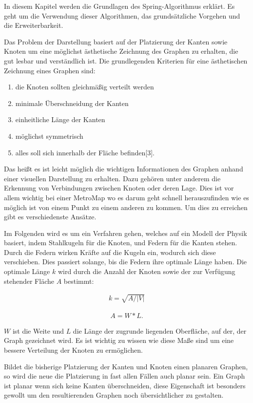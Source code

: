 In diesem Kapitel werden die Grundlagen des Spring-Algorithmus erklärt. 
Es geht um die Verwendung dieser Algorithmen, das grundsätzliche Vorgehen
und die Erweiterbarkeit.


Das Problem der Darstellung basiert auf der Platzierung der Kanten sowie
Knoten um eine möglichst ästhetische Zeichnung des
Graphen zu erhalten, die gut lesbar und verständlich ist. Die grundlegenden Kriterien für eine ästhetischen Zeichnung eines Graphen sind:
\begin{enumerate}
	\item die Knoten sollten gleichmäßig verteilt werden
	\item minimale Überschneidung der Kanten
	\item einheitliche Länge der Kanten
	\item möglichst symmetrisch
	\item alles soll sich innerhalb der Fläche befinden[3].
\end{enumerate}   

Das heißt es ist leicht möglich
die wichtigen Informationen des Graphen anhand einer visuellen Darstellung zu erhalten. 
Dazu gehören unter anderem die Erkennung von Verbindungen zwischen Knoten oder deren Lage. Dies
ist vor allem wichtig bei einer MetroMap wo es darum geht schnell herauszufinden wie es möglich ist
von einem Punkt zu einem anderen zu kommen.
Um dies zu erreichen gibt es verschiedenste Ansätze.

Im Folgenden wird es um ein Verfahren gehen, welches auf ein Modell
der Physik basiert, indem Stahlkugeln für die Knoten, und Federn für die Kanten stehen. Durch die 
Federn wirken Kräfte auf die Kugeln ein, wodurch sich diese verschieben. Dies passiert solange, 
bis die Federn ihre optimale Länge haben. Die optimale Länge $k$ wird durch die Anzahl der Knoten sowie
der zur Verfügung stehender Fläche $A$ bestimmt:

\begin{align}
	k =
	\sqrt{A / |V|}
\end{align}

\begin{align}
	A =
	W * L.
\end{align}

$W$ ist die Weite und $L$ die Länge der zugrunde liegenden Oberfläche, auf der, der Graph gezeichnet wird. Es ist
wichtig zu wissen wie diese Maße sind um eine bessere Verteilung der Knoten zu ermöglichen. 

Bildet die bisherige 
Platzierung der Kanten und Knoten einen planaren Graphen, so wird die neue die Platzierung in fast allen Fällen
auch planar sein. Ein Graph ist planar wenn sich keine Kanten überschneiden, diese Eigenschaft ist besonders gewollt um den resultierenden Graphen noch übersichtlicher zu gestalten.





